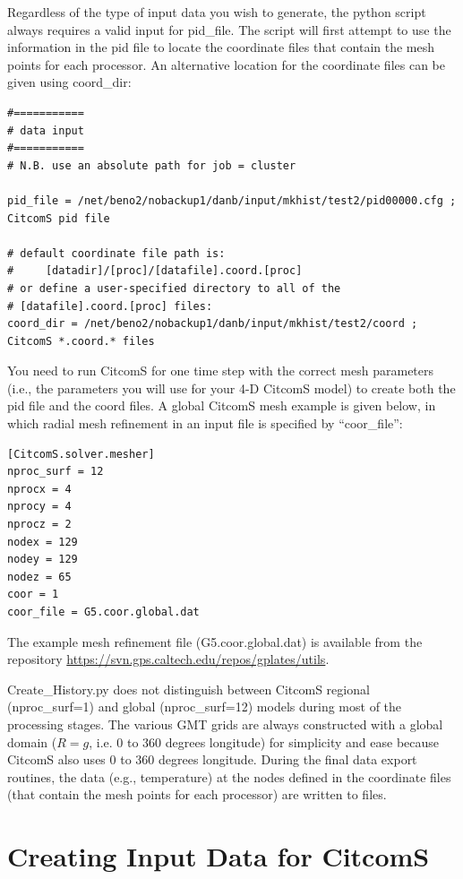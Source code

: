 \documentclass[letterpaper,12pt]{article}
\begin{document}
Regardless of the type of input data you wish to generate, the python script always requires a valid input for pid\_file.
The script will first attempt to use the information in the pid file to locate the coordinate files that contain the mesh points for each processor.
An alternative location for the coordinate files can be given using coord\_dir:
\begin{verbatim}
#===========
# data input
#===========
# N.B. use an absolute path for job = cluster

pid_file = /net/beno2/nobackup1/danb/input/mkhist/test2/pid00000.cfg ; CitcomS pid file

# default coordinate file path is:
#     [datadir]/[proc]/[datafile].coord.[proc]
# or define a user-specified directory to all of the
# [datafile].coord.[proc] files:
coord_dir = /net/beno2/nobackup1/danb/input/mkhist/test2/coord ; CitcomS *.coord.* files
\end{verbatim}
You need to run CitcomS for one time step with the correct mesh parameters (i.e., the parameters you will use for your 4-D CitcomS model) to create both the pid file and the coord files.  A global CitcomS mesh example is given below, in which radial mesh refinement in an input file is specified by ``coor\_file'':

\begin{verbatim}
[CitcomS.solver.mesher]
nproc_surf = 12
nprocx = 4
nprocy = 4
nprocz = 2
nodex = 129
nodey = 129
nodez = 65
coor = 1
coor_file = G5.coor.global.dat
\end{verbatim}

The example mesh refinement file (G5.coor.global.dat) is available from the repository \url{https://svn.gps.caltech.edu/repos/gplates/utils}.

Create\_History.py does not distinguish between CitcomS regional (nproc\_surf=1) and global (nproc\_surf=12) models during most of the processing stages.  The various GMT grids are always constructed with a global domain ($R=g$, i.e. 0 to 360 degrees longitude) for simplicity and ease because CitcomS also uses 0 to 360 degrees longitude.  During the final data export routines, the data (e.g., temperature) at the nodes defined in the coordinate files (that contain the mesh points for each processor) are written to files.
\section{Creating Input Data for CitcomS}
\end{document}
